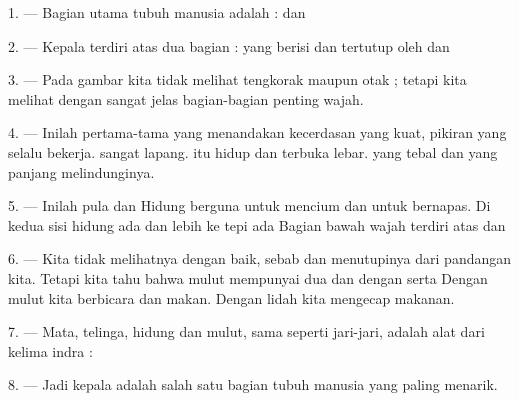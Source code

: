 \VUsaut{4.0mm}
\VUsaut{2.0mm}

\VUsaut{2.4mm}
\VUsaut{3.0mm}

\VUsaut{3.0mm}

1. --- Bagian utama tubuh manusia adalah : 
 dan 

2. --- Kepala terdiri atas dua bagian :  yang berisi
 dan tertutup oleh  dan 

3. --- Pada gambar kita tidak melihat tengkorak maupun otak ; tetapi
kita melihat dengan sangat jelas bagian-bagian penting wajah.

4. --- Inilah pertama-tama  yang menandakan kecerdasan
yang kuat, pikiran yang selalu bekerja.  sangat
lapang.  itu hidup dan terbuka lebar.  yang
tebal dan  yang panjang melindunginya.

5. --- Inilah pula  dan  Hidung
berguna untuk mencium dan untuk bernapas. Di kedua sisi hidung ada
 dan lebih ke tepi ada  Bagian bawah
wajah terdiri atas  dan 

6. --- Kita tidak melihatnya dengan baik, sebab  dan
 menutupinya dari pandangan kita. Tetapi kita tahu
bahwa mulut mempunyai dua   dan
 dengan  serta 
Dengan mulut kita berbicara dan makan. Dengan lidah kita mengecap
makanan.

7. --- Mata, telinga, hidung dan mulut, sama seperti jari-jari,
adalah alat dari kelima indra : 
   

8. --- Jadi kepala adalah salah satu bagian tubuh manusia yang paling
menarik.

\VUsaut{4.4mm}
\VUsaut{3.0mm}

